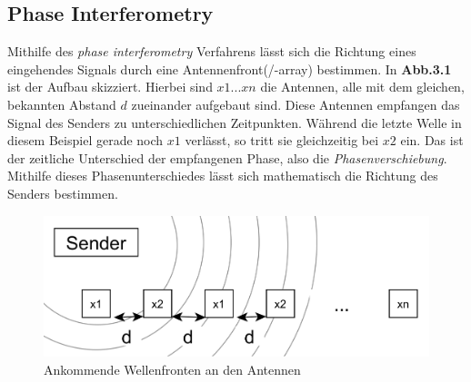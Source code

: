 \documentclass[12pt, a4wide]{scrreprt}
\begin{document}
    \subsection{Phase Interferometry}
Mithilfe des \textit{phase interferometry}\cite{q1} Verfahrens lässt sich die Richtung eines eingehendes Signals durch eine Antennenfront(/-array) bestimmen. In {\bf Abb.3.1} ist der Aufbau skizziert. Hierbei sind $x1...xn$ die Antennen, alle mit dem gleichen, bekannten Abstand $d$ zueinander aufgebaut sind. Diese Antennen empfangen das Signal des Senders zu unterschiedlichen Zeitpunkten. Während die letzte Welle in diesem Beispiel gerade noch $x1$ verlässt, so tritt sie gleichzeitig bei $x2$ ein. Das ist der zeitliche Unterschied der empfangenen Phase, also die \textit{Phasenverschiebung}. Mithilfe dieses Phasenunterschiedes lässt sich mathematisch die Richtung des Senders bestimmen.\\

\begin{figure}[!htb]
\centering
\includegraphics[scale=.27]{phase_int2.png}
\caption{Ankommende Wellenfronten an den Antennen}
\end{figure}

\end{document}
